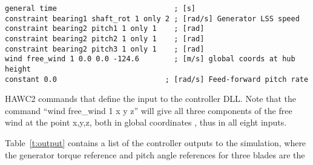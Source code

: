 \begin{table}[t]
\center
\begin{verbatim}
general time                           ; [s]
constraint bearing1 shaft_rot 1 only 2 ; [rad/s] Generator LSS speed
constraint bearing2 pitch1 1 only 1    ; [rad]
constraint bearing2 pitch2 1 only 1    ; [rad]
constraint bearing2 pitch3 1 only 1    ; [rad]
wind free_wind 1 0.0 0.0 -124.6        ; [m/s] global coords at hub height
constant 0.0                         ; [rad/s] Feed-forward pitch rate
\end{verbatim}
\caption{HAWC2 commands that define the input to the controller DLL. Note that the command ``wind free\_wind 1 x y z'' will give all three components of the free wind at the point x,y,z, both in global coordinates \cite{Larsen12}, thus in all eight inputs. \label{t:input}}
\end{table}

Table~\ref{t:output} contains a list of the controller outputs to the simulation, where the generator torque reference and pitch angle references for three blades are the


